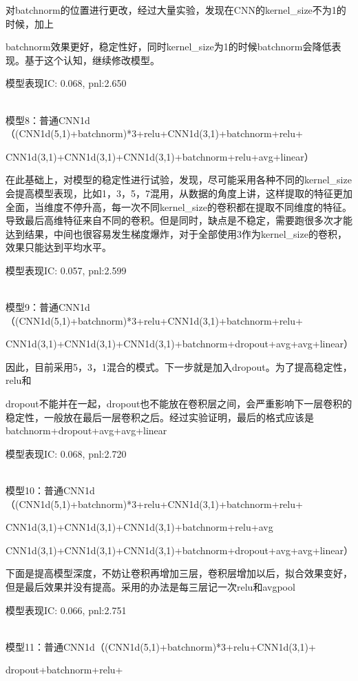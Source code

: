 \documentclass[11pt]{ctexart}
\begin{document}
对batchnorm的位置进行更改，经过大量实验，发现在CNN的kernel\_size不为1的时候，加上 \par batchnorm效果更好，稳定性好，同时kernel\_size为1的时候batchnorm会降低表现。基于这个认知，继续修改模型。

模型表现{\kaishu \small IC: 0.068, pnl:2.650}


~\\
模型8：普通CNN1d（(CNN1d(5,1)+batchnorm)*3+relu+CNN1d(3,1)+batchnorm+relu+

CNN1d(3,1)+CNN1d(3,1)+CNN1d(3,1)+batchnorm+relu+avg+linear）

在此基础上，对模型的稳定性进行试验，发现，尽可能采用各种不同的kernel\_size会提高模型表现，比如1，3，5，7混用，从数据的角度上讲，这样提取的特征更加全面，当维度不停升高，每一次不同kernel\_size的卷积都在提取不同维度的特征。导致最后高维特征来自不同的卷积。但是同时，缺点是不稳定，需要跑很多次才能达到结果，中间也很容易发生梯度爆炸，对于全部使用3作为kernel\_size的卷积，效果只能达到平均水平。

模型表现{\kaishu \small IC: 0.057, pnl:2.599}


~\\
模型9：普通CNN1d（(CNN1d(5,1)+batchnorm)*3+relu+CNN1d(3,1)+batchnorm+relu+

CNN1d(3,1)+CNN1d(3,1)+CNN1d(3,1)+batchnorm+dropout+avg+avg+linear）

因此，目前采用5，3，1混合的模式。下一步就是加入dropout。为了提高稳定性，relu和\par dropout不能并在一起，dropout也不能放在卷积层之间，会严重影响下一层卷积的稳定性，一般放在最后一层卷积之后。经过实验证明，最后的格式应该是batchnorm+dropout+avg+avg+linear

模型表现{\kaishu \small IC: 0.068, pnl:2.720}

~\\
模型10：普通CNN1d（(CNN1d(5,1)+batchnorm)*3+relu+CNN1d(3,1)+batchnorm+relu+

CNN1d(3,1)+CNN1d(3,1)+CNN1d(3,1)+batchnorm+relu+avg

CNN1d(3,1)+CNN1d(3,1)+CNN1d(3,1)+batchnorm+dropout+avg+avg+linear）

下面是提高模型深度，不妨让卷积再增加三层，卷积层增加以后，拟合效果变好，但是最后效果并没有提高。采用的办法是每三层记一次relu和avgpool

模型表现{\kaishu \small IC: 0.066, pnl:2.751}

~\\
模型11：普通CNN1d（(CNN1d(5,1)+batchnorm)*3+relu+CNN1d(3,1)+

dropout+batchnorm+relu+
\end{document}

